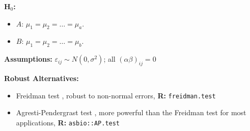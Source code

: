 \documentclass[12pt,english]{article}\usepackage[]{graphicx}\usepackage[table]{xcolor}
\begin{document}
\noindent \textbf{H$_0$:}
\begin{itemize}
\item $A$: $\mu_1 = \mu_2 = \dots = \mu_a$.
\item $B$: $\mu_1 = \mu_2 = \dots = \mu_b$.
\end{itemize}
\vspace{0.1in}

\noindent \textbf{Assumptions:} $\varepsilon_{ij} \sim N(0, \sigma^2)$; all $(\alpha\beta)_{ij} = 0$
\vspace{0.1in}

\noindent \textbf{Robust Alternatives:}
\begin{small}
\begin{itemize}
\item Freidman test \citep{kruskal1952}, robust to non-normal errors, \textbf{R:} \texttt{freidman.test}\vspace{-.1in}
\item Agresti-Pendergrast test \citep{agresti1986}, more powerful than the Freidman test for most applications, \textbf{R:} \texttt{asbio::AP.test}
\end{itemize}
\end{small}
\vspace{0.1in}
\end{document}
